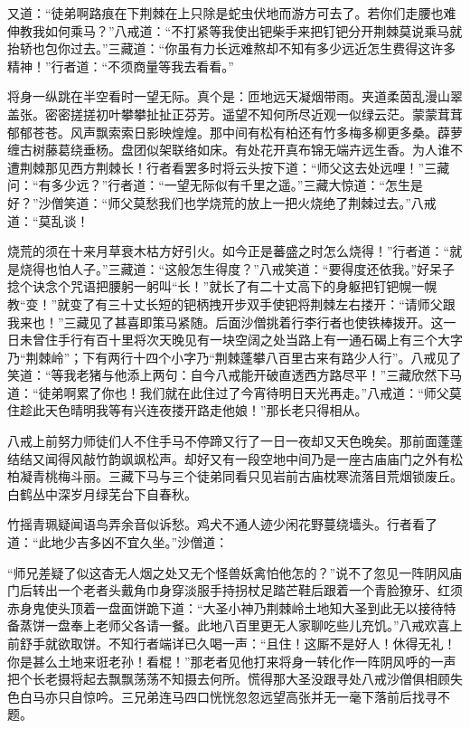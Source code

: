 \documentclass[12pt,UTF8]{ctexbook}
\begin{document}
又道：“徒弟啊路痕在下荆棘在上只除是蛇虫伏地而游方可去了。若你们走腰也难伸教我如何乘马？”八戒道：“不打紧等我使出钯柴手来把钉钯分开荆棘莫说乘马就抬轿也包你过去。”三藏道：“你虽有力长远难熬却不知有多少远近怎生费得这许多精神！”行者道：“不须商量等我去看看。”

将身一纵跳在半空看时一望无际。真个是：匝地远天凝烟带雨。夹道柔茵乱漫山翠盖张。密密搓搓初叶攀攀扯扯正芬芳。遥望不知何所尽近观一似绿云茫。蒙蒙茸茸郁郁苍苍。风声飘索索日影映煌煌。那中间有松有柏还有竹多梅多柳更多桑。薜萝缠古树藤葛绕垂杨。盘团似架联络如床。有处花开真布锦无端卉远生香。为人谁不遭荆棘那见西方荆棘长！行者看罢多时将云头按下道：“师父这去处远哩！”三藏问：“有多少远？”行者道：“一望无际似有千里之遥。”三藏大惊道：“怎生是好？”沙僧笑道：“师父莫愁我们也学烧荒的放上一把火烧绝了荆棘过去。”八戒道：“莫乱谈！

烧荒的须在十来月草衰木枯方好引火。如今正是蕃盛之时怎么烧得！”行者道：“就是烧得也怕人子。”三藏道：“这般怎生得度？”八戒笑道：“要得度还依我。”好呆子捻个诀念个咒语把腰躬一躬叫“长！”就长了有二十丈高下的身躯把钉钯幌一幌教“变！”就变了有三十丈长短的钯柄拽开步双手使钯将荆棘左右搂开：“请师父跟我来也！”三藏见了甚喜即策马紧随。后面沙僧挑着行李行者也使铁棒拨开。这一日未曾住手行有百十里将次天晚见有一块空阔之处当路上有一通石碣上有三个大字乃“荆棘岭”；下有两行十四个小字乃“荆棘蓬攀八百里古来有路少人行”。八戒见了笑道：“等我老猪与他添上两句：自今八戒能开破直透西方路尽平！”三藏欣然下马道：“徒弟啊累了你也！我们就在此住过了今宵待明日天光再走。”八戒道：“师父莫住趁此天色晴明我等有兴连夜搂开路走他娘！”那长老只得相从。

八戒上前努力师徒们人不住手马不停蹄又行了一日一夜却又天色晚矣。那前面蓬蓬结结又闻得风敲竹韵飒飒松声。却好又有一段空地中间乃是一座古庙庙门之外有松柏凝青桃梅斗丽。三藏下马与三个徒弟同看只见岩前古庙枕寒流落目荒烟锁废丘。白鹤丛中深岁月绿芜台下自春秋。

竹摇青珮疑闻语鸟弄余音似诉愁。鸡犬不通人迹少闲花野蔓绕墙头。行者看了道：“此地少吉多凶不宜久坐。”沙僧道：

“师兄差疑了似这杳无人烟之处又无个怪兽妖禽怕他怎的？”说不了忽见一阵阴风庙门后转出一个老者头戴角巾身穿淡服手持拐杖足踏芒鞋后跟着一个青脸獠牙、红须赤身鬼使头顶着一盘面饼跪下道：“大圣小神乃荆棘岭土地知大圣到此无以接待特备蒸饼一盘奉上老师父各请一餐。此地八百里更无人家聊吃些儿充饥。”八戒欢喜上前舒手就欲取饼。不知行者端详已久喝一声：“且住！这厮不是好人！休得无礼！你是甚么土地来诳老孙！看棍！”那老者见他打来将身一转化作一阵阴风呼的一声把个长老摄将起去飘飘荡荡不知摄去何所。慌得那大圣没跟寻处八戒沙僧俱相顾失色白马亦只自惊吟。三兄弟连马四口恍恍忽忽远望高张并无一毫下落前后找寻不题。
\end{document}
